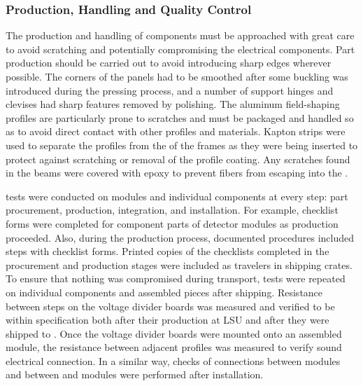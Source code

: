 


\subsubsection{Production, Handling and Quality Control}
\label{sec:fdsp-hv-protodune-lessons-prod}

The production and handling of  components must be approached with %
great care to avoid scratching and potentially compromising the electrical components. 
Part production should be carried out to avoid introducing sharp edges wherever possible.
The corners of the  panels had to be smoothed after some buckling was introduced during the pressing process, and a number of support hinges and clevises had sharp features removed by polishing.
The aluminum field-shaping profiles are particularly prone to scratches and must be packaged and handled so as to avoid direct contact with other profiles and materials.
Kapton strips were used to separate the profiles from the  of the  frames as they were being inserted to protect against scratching or removal of the profile coating.
Any scratches found in the  beams were covered with epoxy to prevent fibers from escaping into the .

 tests were conducted on  modules and individual components at every step: %
part procurement, production, integration, and installation.  For example, checklist forms were completed for component parts of detector modules as production proceeded.  Also, during the production process, documented procedures included  steps with checklist forms.  Printed copies of the checklists completed in the procurement and production stages were included as travelers in shipping crates.  
To ensure that nothing was compromised during transport,  tests were repeated on individual components and assembled pieces after shipping. 
Resistance between steps on the voltage divider boards was measured and verified to be within specification both after their production at LSU and after they were shipped to .
Once the voltage divider boards were mounted onto an assembled  module, the resistance between adjacent profiles was measured to verify sound electrical connection.
In a similar way,  checks of connections between  modules and between  and  modules were performed after installation.

